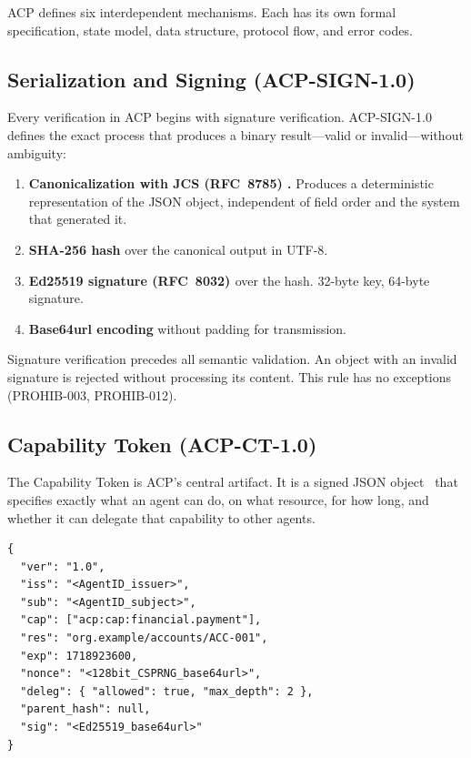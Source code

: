 \documentclass[11pt]{article}
\theoremstyle{definition}
\begin{document}
ACP defines six interdependent mechanisms. Each has its own formal specification, state model, data structure, protocol flow, and error codes.

\subsection{Serialization and Signing (ACP-SIGN-1.0)}

Every verification in ACP begins with signature verification.
ACP-SIGN-1.0 defines the exact process that produces a binary result---valid or invalid---without ambiguity:

\begin{enumerate}[noitemsep]
  \item \textbf{Canonicalization with JCS (RFC~8785) \cite{rfc8785}.}
        Produces a deterministic representation of the JSON object, independent of field order and the system that generated it.
  \item \textbf{SHA-256 hash} over the canonical output in UTF-8.
  \item \textbf{Ed25519 signature (RFC~8032) \cite{rfc8032}} over the hash.
        32-byte key, 64-byte signature.
  \item \textbf{Base64url encoding} without padding for transmission.
\end{enumerate}

Signature verification precedes all semantic validation.
An object with an invalid signature is rejected without processing its content.
This rule has no exceptions (PROHIB-003, PROHIB-012).

\subsection{Capability Token (ACP-CT-1.0)}

The Capability Token is ACP's central artifact.
It is a signed JSON object~\cite{rfc7519} that specifies exactly what an agent can do, on what resource, for how long, and whether it can delegate that capability to other agents.

\begin{lstlisting}[language={}]
{
  "ver": "1.0",
  "iss": "<AgentID_issuer>",
  "sub": "<AgentID_subject>",
  "cap": ["acp:cap:financial.payment"],
  "res": "org.example/accounts/ACC-001",
  "exp": 1718923600,
  "nonce": "<128bit_CSPRNG_base64url>",
  "deleg": { "allowed": true, "max_depth": 2 },
  "parent_hash": null,
  "sig": "<Ed25519_base64url>"
}
\end{lstlisting}
\end{document}
